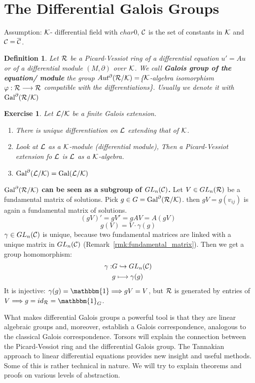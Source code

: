 \documentclass[11pt]{article}
\newtheorem{exercise}[thm]{Exercise}
\newtheorem{dfn}[thm]{Definition}
\newcommand{\pd}{\partial}
\newcommand{\calc}{{\cal C}}
\newcommand{\calk}{{\cal K}}
\newcommand{\call}{{\cal L}}
\newcommand{\calr}{{\cal R}}
\newcommand{\Lrta}{\Longrightarrow}
\newcommand{\lrta}{\longrightarrow}
\begin{document}
\section{The Differential Galois Groups}

Assumption: $\calk$- differential field with $char 0$, $\calc$ is the set of constants in $\calk$ and $\calc=\overline{\calc}$.
\begin{dfn}
Let $\calr$ be a Picard-Vessiot ring of a differential equation $u'=Au$ or of a differential module $(M,\pd)$ over $\calk$. We call \textbf{Galois group of the equation/ module} the group 
$Aut^{\pd}(\calr/\calk)=$\{$\calk$-algebra isomorphism $\varphi:\calr\lrta \calr$ compatible with the differentiations\}. Usually we denote it with $\text{Gal}^{\pd}(\calr/\calk)$
\end{dfn}
\begin{exercise}
Let $\call/\calk$ be a finite Galois extension.
\begin{enumerate}[label=(\arabic*)]
\item There is unique differentiation on $\call$ extending that of $\calk$.
\item Look at $\call$ as a $\calk$-module (differential module), Then a Picard-Vessiot extension fo $\call$ is $\call$ as a $\calk$-algebra.
\item $\text{Gal}^{\pd}(\call/\calk)=\text{Gal}(\call/\calk)$
\end{enumerate}
\end{exercise}


\textbf{$\text{Gal}^\pd(\calr/\calk)$ can be seen as a subgroup of $GL_n(\calc)$.}
Let $V\in GL_n(\calr)$ be a fundamental matrix of solutions. Pick $g\in G=\text{Gal}^\pd(\calr/\calk)$. then  $gV=g(v_{ij})$ is again a fundamental matrix of solutions.
$$
(gV)'=g V'=g AV=A(gV)
$$
$$
g(V)=V\cdot \gamma(g)
$$
$\gamma\in GL_n(\calc)$ is unique, because two fundamental matrices are linked with a unique matrix in $GL_n(\calc)$ (Remark~\ref{rmk:fundamental_matrix}). Then we get a group homomorphism: 
$$
\begin{aligned}
\gamma:&G\hookrightarrow GL_n(\calc)\\
& g\longmapsto \gamma(g)
\end{aligned}
$$
It is injective:
$\gamma(g)=\mathbbm{1}\Lrta gV=V$, but $\calr$ is generated by entries of $V\Lrta g=id_\calr=\mathbbm{1}_G$.


What makes differential Galois groups a powerful tool is that they are linear algebraic groups and, moreover, establish a Galois correspondence, analogous to the classical Galois correspondence. Torsors will explain the connection between the Picard-Vessiot ring and the differential Galois group. The Tannakian approach to linear differential equations provides new insight and useful methods. Some of this is rather technical in nature. We will try to explain theorems and proofs on various levels of abstraction.
\end{document}
